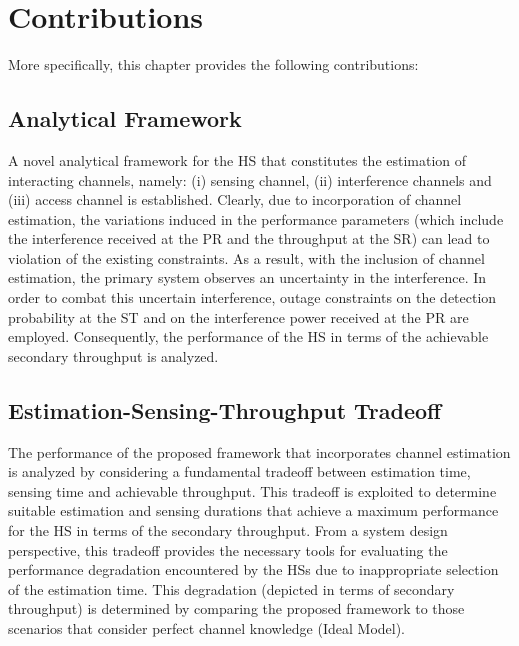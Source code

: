 \section{Contributions}
More specifically, this chapter provides the following contributions:

\subsection{Analytical Framework}
A novel analytical framework for the HS that constitutes the estimation of interacting channels, namely: (i) sensing channel, (ii) interference channels and (iii) access channel is established. Clearly, due to incorporation of channel estimation, the variations induced in the performance parameters (which include the interference received at the PR and the throughput at the SR) can lead to violation of the existing constraints. As a result, with the inclusion of channel estimation, the primary system observes an uncertainty in the interference. 
In order to combat this uncertain interference, outage constraints on the detection probability at the ST and on the interference power received at the PR are employed. Consequently, the performance of the HS in terms of the achievable secondary throughput is analyzed.
\subsection{Estimation-Sensing-Throughput Tradeoff}
The performance of the proposed framework that incorporates channel estimation is analyzed by considering a fundamental tradeoff between estimation time, sensing time and achievable throughput. This tradeoff is exploited to determine suitable estimation and sensing durations that achieve a maximum performance for the HS in terms of the secondary throughput. From a system design perspective, this tradeoff provides the necessary tools for evaluating the performance degradation encountered by the HSs due to inappropriate selection of the estimation time. This degradation (depicted in terms of secondary throughput) is determined by comparing the proposed framework to those scenarios that consider perfect channel knowledge (Ideal Model).  

